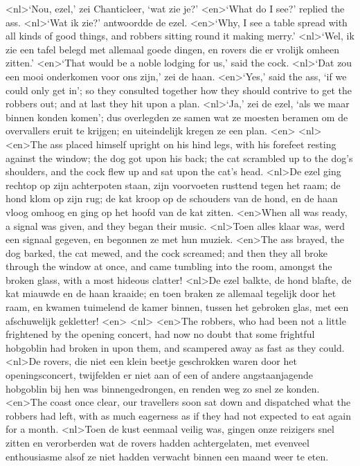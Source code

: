 <nl>`Nou, ezel,' zei Chanticleer, `wat zie je?'
<en>`What do I see?' replied the ass.
<nl>`Wat ik zie?' antwoordde de ezel.
<en>`Why, I see a table spread with all kinds of good things, and robbers sitting round it making merry.'
<nl>`Wel, ik zie een tafel belegd met allemaal goede dingen, en rovers die er vrolijk omheen zitten.'
<en>`That would be a noble lodging for us,' said the cock.
<nl>`Dat zou een mooi onderkomen voor ons zijn,' zei de haan.
<en>`Yes,' said the ass, `if we could only get in'; so they consulted together how they should contrive to get the robbers out; and at last they hit upon a plan.
<nl>`Ja,' zei de ezel, `als we maar binnen konden komen'; dus overlegden ze samen wat  ze  moesten beramen om de overvallers eruit te krijgen; en uiteindelijk kregen ze een plan.
<en>
<nl>
<en>The ass placed himself upright on his hind legs, with his forefeet resting against the window; the dog got upon his back; the cat scrambled up to the dog's shoulders, and the cock flew up and sat upon the cat's head.
<nl>De ezel ging rechtop op zijn achterpoten staan, zijn voorvoeten rusttend tegen het raam; de hond klom op zijn rug; de kat kroop op  de schouders van de hond, en de haan vloog omhoog en ging op het hoofd van de kat zitten.
<en>When all was ready, a signal was given, and they began their music.
<nl>Toen alles klaar was, werd  een signaal gegeven, en begonnen ze met hun muziek.
<en>The ass brayed, the dog barked, the cat mewed, and the cock screamed; and then they all broke through the window at once, and came tumbling into the room, amongst the broken glass, with a most hideous clatter!
<nl>De ezel balkte, de hond blafte, de kat miauwde en de haan kraaide; en toen braken ze allemaal tegelijk door het raam, en kwamen tuimelend de kamer binnen, tussen het gebroken glas, met een  afschuwelijk gekletter!
<en>
<nl>
<en>The robbers, who had been not a little frightened by the opening concert, had now no doubt that some frightful hobgoblin had broken in upon them, and scampered away as fast as they could.
<nl>De rovers, die niet een klein beetje geschrokken waren door het openingsconcert, twijfelden er niet aan of een of andere angstaanjagende hobgoblin bij hen was binnengedrongen, en renden weg zo snel ze konden.
<en>The coast once clear, our travellers soon sat down and dispatched what the robbers had left, with as much eagerness as if they had not expected to eat again for a month.
<nl>Toen de kust eenmaal veilig was, gingen onze reizigers snel zitten en verorberden wat de rovers hadden achtergelaten, met evenveel enthousiasme alsof ze niet hadden verwacht binnen een maand weer te eten.
